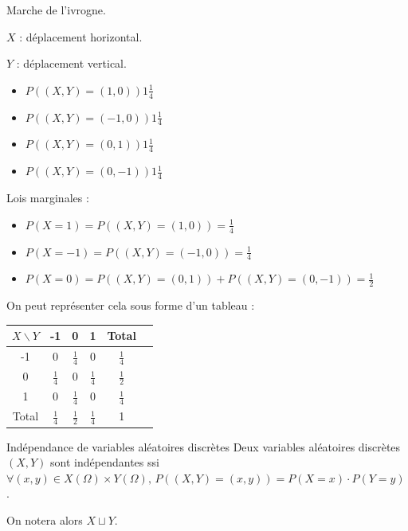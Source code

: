 \begin{exemple}
    Marche de l'ivrogne. 

    $X$ : déplacement horizontal.

    $Y$ : déplacement vertical.


    \svspace 
    
    \begin{itemize}
        \item $P((X, Y) = (1, 0)) 1 \frac 1 4$
        \item $P((X, Y) = (-1, 0)) 1 \frac 1 4$
        \item $P((X, Y) = (0, 1)) 1 \frac 1 4$
        \item $P((X, Y) = (0, -1)) 1 \frac 1 4$
    \end{itemize}

    Lois marginales : 
    \begin{itemize}
        \item $P(X = 1) = P((X, Y) = (1, 0)) = \frac 1 4$
        \item $P(X = -1) = P((X, Y) = (-1, 0)) = \frac 1 4$
        \item $P(X = 0) = P((X, Y) = (0, 1)) + P((X, Y) = (0, -1)) = \frac 1 2$
    \end{itemize}

    On peut représenter cela sous forme d'un tableau : 
    \begin{center}
        \begin{tabular}{c|c|c|c|c|c}
            $X \backslash Y$ & -1 & 0 & 1 & Total \\
            \hline
            -1 & 0 & $\frac 1 4$ & 0 & $\frac 1 4$ \\
            \hline
            0 & $\frac 1 4$ & 0 & $\frac 1 4$ & $\frac 1 2$ \\
            \hline
            1 & 0 & $\frac 1 4$ & 0 & $\frac 1 4$ \\
            \hline
            Total & $\frac 1 4$ & $\frac 1 2$ & $\frac 1 4$ & 1 
        \end{tabular}
    \end{center}


\end{exemple}

\begin{definition}{Indépendance de variables aléatoires discrètes}{}
    Deux variables aléatoires discrètes $(X, Y)$ sont indépendantes ssi 
    $\forall (x, y) \in X(\Omega) \times Y(\Omega), \, P((X, Y) = (x, y)) = P(X = x) \cdot P(Y = y)$.

    On notera alors $X \sqcup Y$.
\end{definition}

